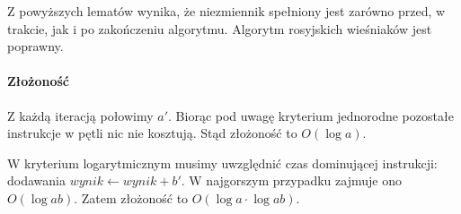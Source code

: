 Z powyższych lematów wynika, że niezmiennik spełniony jest zarówno przed, w trakcie, jak i po zakończeniu algorytmu. 
Algorytm rosyjskich wieśniaków jest poprawny.

\paragraph{Złożoność}

Z każdą iteracją połowimy $a'$. 
Biorąc pod uwagę kryterium jednorodne pozostałe instrukcje w pętli nic nie kosztują. 
Stąd złożoność to $O(\log a)$.

W kryterium logarytmicznym musimy uwzględnić czas dominującej instrukcji: dodawania  $wynik \leftarrow wynik + b'$. 
W najgorszym przypadku zajmuje ono $O(\log ab)$. Zatem złożoność to $O(\log a \cdot \log ab)$.
